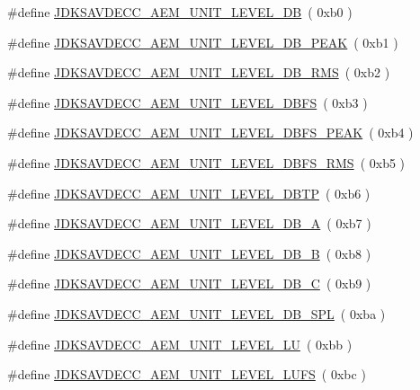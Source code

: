 \begin{DoxyCompactItemize}
\item 
\#define \hyperlink{group__units_ga84d9999230311f53a3fea86849fb45ef}{J\+D\+K\+S\+A\+V\+D\+E\+C\+C\+\_\+\+A\+E\+M\+\_\+\+U\+N\+I\+T\+\_\+\+L\+E\+V\+E\+L\+\_\+\+DB}~( 0xb0 )
\item 
\#define \hyperlink{group__units_gaf54f775ea6b45d6c45cfffb08b0fdb30}{J\+D\+K\+S\+A\+V\+D\+E\+C\+C\+\_\+\+A\+E\+M\+\_\+\+U\+N\+I\+T\+\_\+\+L\+E\+V\+E\+L\+\_\+\+D\+B\+\_\+\+P\+E\+AK}~( 0xb1 )
\item 
\#define \hyperlink{group__units_ga55c667ec42392df66d5bc2a7e9726f18}{J\+D\+K\+S\+A\+V\+D\+E\+C\+C\+\_\+\+A\+E\+M\+\_\+\+U\+N\+I\+T\+\_\+\+L\+E\+V\+E\+L\+\_\+\+D\+B\+\_\+\+R\+MS}~( 0xb2 )
\item 
\#define \hyperlink{group__units_gaac04d73ea782fa918f3861ec5cd7e71f}{J\+D\+K\+S\+A\+V\+D\+E\+C\+C\+\_\+\+A\+E\+M\+\_\+\+U\+N\+I\+T\+\_\+\+L\+E\+V\+E\+L\+\_\+\+D\+B\+FS}~( 0xb3 )
\item 
\#define \hyperlink{group__units_ga76f2bb9641f6633b96930113aac44733}{J\+D\+K\+S\+A\+V\+D\+E\+C\+C\+\_\+\+A\+E\+M\+\_\+\+U\+N\+I\+T\+\_\+\+L\+E\+V\+E\+L\+\_\+\+D\+B\+F\+S\+\_\+\+P\+E\+AK}~( 0xb4 )
\item 
\#define \hyperlink{group__units_gabc73964b3ec2eed7341890e291c84143}{J\+D\+K\+S\+A\+V\+D\+E\+C\+C\+\_\+\+A\+E\+M\+\_\+\+U\+N\+I\+T\+\_\+\+L\+E\+V\+E\+L\+\_\+\+D\+B\+F\+S\+\_\+\+R\+MS}~( 0xb5 )
\item 
\#define \hyperlink{group__units_ga0af3e14c9b5e77935d8ad7b4dc6e4e02}{J\+D\+K\+S\+A\+V\+D\+E\+C\+C\+\_\+\+A\+E\+M\+\_\+\+U\+N\+I\+T\+\_\+\+L\+E\+V\+E\+L\+\_\+\+D\+B\+TP}~( 0xb6 )
\item 
\#define \hyperlink{group__units_ga8bdfd0431101f9e29e5a78ede6dab23c}{J\+D\+K\+S\+A\+V\+D\+E\+C\+C\+\_\+\+A\+E\+M\+\_\+\+U\+N\+I\+T\+\_\+\+L\+E\+V\+E\+L\+\_\+\+D\+B\+\_\+A}~( 0xb7 )
\item 
\#define \hyperlink{group__units_ga27888502427e8d1624cf189560b21ed1}{J\+D\+K\+S\+A\+V\+D\+E\+C\+C\+\_\+\+A\+E\+M\+\_\+\+U\+N\+I\+T\+\_\+\+L\+E\+V\+E\+L\+\_\+\+D\+B\+\_\+B}~( 0xb8 )
\item 
\#define \hyperlink{group__units_ga987ca399d155f8b9fdb73ff7928075ca}{J\+D\+K\+S\+A\+V\+D\+E\+C\+C\+\_\+\+A\+E\+M\+\_\+\+U\+N\+I\+T\+\_\+\+L\+E\+V\+E\+L\+\_\+\+D\+B\+\_\+C}~( 0xb9 )
\item 
\#define \hyperlink{group__units_gaadbc717c276c445488da28e3576a5ad1}{J\+D\+K\+S\+A\+V\+D\+E\+C\+C\+\_\+\+A\+E\+M\+\_\+\+U\+N\+I\+T\+\_\+\+L\+E\+V\+E\+L\+\_\+\+D\+B\+\_\+\+S\+PL}~( 0xba )
\item 
\#define \hyperlink{group__units_ga47a5bbb20e1819ca15f24030f4cbeb85}{J\+D\+K\+S\+A\+V\+D\+E\+C\+C\+\_\+\+A\+E\+M\+\_\+\+U\+N\+I\+T\+\_\+\+L\+E\+V\+E\+L\+\_\+\+LU}~( 0xbb )
\item 
\#define \hyperlink{group__units_ga291a43c5e21be1f38a79dd146a183f1c}{J\+D\+K\+S\+A\+V\+D\+E\+C\+C\+\_\+\+A\+E\+M\+\_\+\+U\+N\+I\+T\+\_\+\+L\+E\+V\+E\+L\+\_\+\+L\+U\+FS}~( 0xbc )
\end{DoxyCompactItemize}


